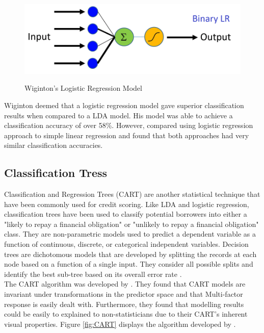 \begin{figure}[!htb]
\centering
\includegraphics[width = \textwidth]{images/logistic_reg.png}
\caption{Wiginton's Logistic Regression Model}
\parencite{LogRegFig}
\label{fig:LR}
\end{figure}

\vspace{10pt}

Wiginton deemed that a logistic regression model gave superior classification results when compared to a LDA model. His model was able to achieve a classification accuracy of over 58\%. However, \textcite{LogRegHand} compared using logistic regression approach to simple linear regression and found that both approaches had very similar classification accuracies. 

\subsection{Classification Tress}

Classification and Regression Trees (CART) are another statistical technique that have been commonly used for credit scoring. Like LDA and logistic regression, classification trees have been used to classify potential borrowers into either a "likely to repay a financial obligation" or "unlikely to repay a financial obligation" class. They are non-parametric models used to predict a dependent variable as a function of continuous, discrete, or categorical  independent variables. Decision trees are dichotomous models that are developed by splitting the records at each node based on a function of a single input. They consider all possible splits and identify the best sub-tree based on its overall error rate \parencite{DecTreesZekic}. \\

The CART algorithm was developed by \textcite{DecTreesBrieman}. They found that CART models are invariant under transformations in the predictor space and that Multi-factor response is easily dealt with. Furthermore, they found that modelling results could be easily to explained to non-statisticians due to their CART's inherent visual properties. Figure \ref{fig:CART} displays the algorithm developed by \textcite{DecTreesBrieman}. 

